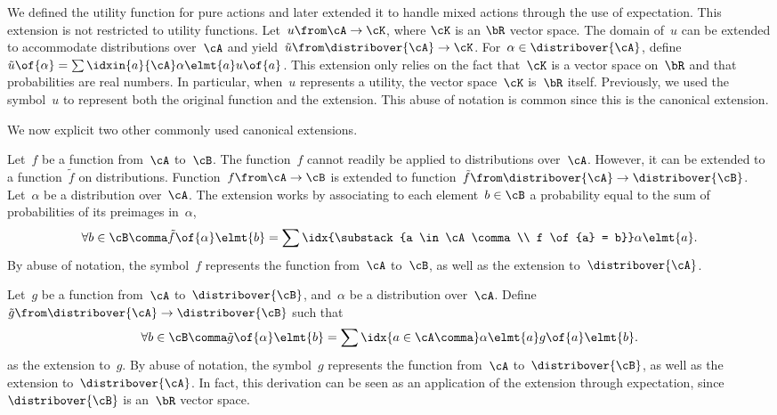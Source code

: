 \begin{note}
\label{note:canonical_extensions}
We defined the utility function for pure actions and later extended it to handle mixed actions through the use of expectation.
This extension is not restricted to utility functions.
Let~\(u \from \cA \to \cK\), where \(\cK\) is an \(\bR\) vector space.
The domain of~\(u\) can be extended to accommodate distributions over~\(\cA\) and yield~\(\tilde{u} \from \distribover{\cA} \to \cK\).
For~\(\alpha \in \distribover{\cA}\), define~\(\tilde{u} \of{\alpha} = \sum\idxin{a}{\cA} \alpha \elmt{a} u \of{a}\).
This extension only relies on the fact that~\(\cK\) is a vector space on~\(\bR\) and that probabilities are real numbers.
In particular, when~\(u\) represents a utility, the vector space~\(\cK\) is~\(\bR\) itself.
Previously, we used the symbol~\(u\) to represent both the original function and the extension.
This abuse of notation is common since this is the canonical extension.

We now explicit two other commonly used canonical extensions.

Let~\(f\) be a function from~\(\cA\) to~\(\cB\).
The function~\(f\) cannot readily be applied to distributions over~\(\cA\).
However, it can be extended to a function~\(\tilde{f}\) on distributions.
Function~\(f \from \cA \to \cB\) is extended to function~\(\tilde{f} \from \distribover{\cA} \to \distribover{\cB}\).
Let~\(\alpha\) be a distribution over~\(\cA\).
The extension works by associating to each element~\(b \in \cB\) a probability equal to the sum of probabilities of its preimages in~\(\alpha\), \ie
\[
\forall b \in \cB \comma \tilde{f} \of{\alpha} \elmt{b}
=
\sum\idx{\substack{a \in \cA \comma \\ f \of{a} = b}} \alpha \elmt{a}.
\]
By abuse of notation, the symbol~\(f\) represents the function from~\(\cA\) to~\(\cB\), as well as the extension to~\(\distribover{\cA}\).

Let~\(g\) be a function from~\(\cA\) to~\(\distribover{\cB}\), and~\(\alpha\) be a distribution over~\(\cA\).
Define \(\tilde{g} \from \distribover{\cA} \to \distribover{\cB}\) such that
\[
\forall b \in \cB \comma \tilde{g} \of{\alpha} \elmt{b} = \sum\idx{a \in \cA\comma} \alpha \elmt{a} g \of{a} \elmt{b}.
\]
as the extension to~\(g\).
By abuse of notation, the symbol~\(g\) represents the function from~\(\cA\) to~\(\distribover{\cB}\), as well as the extension to~\(\distribover{\cA}\).
In fact, this derivation can be seen as an application of the extension through expectation, since~\(\distribover{\cB}\) is an~\(\bR\) vector space.


\end{note}

